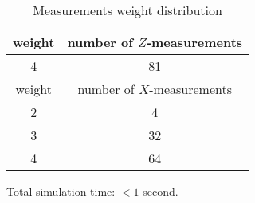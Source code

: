 \documentclass[12pt]{article}
\begin{document}
\begin{table}[h]
\centering
\begin{tabular}{c c}
\hline
weight & number of $Z$-measurements\\
\hline
4 & 81\\
\hline
\hline
weight & number of $X$-measurements\\
\hline
2 & 4\\
3 & 32\\
4 & 64\\
\hline
\end{tabular}
\caption{Measurements weight distribution}
\end{table}
\vspace{.3cm}



\vspace{2cm}
Total simulation time: $< 1$ second.
\end{document}
